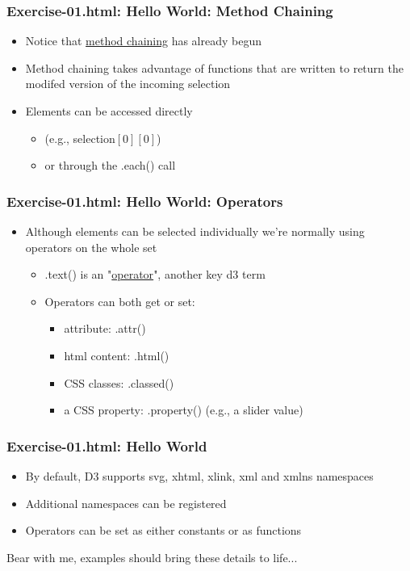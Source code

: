 \documentclass{beamer}
\begin{document}
\begin{frame}
    \frametitle{Exercise-01.html: Hello World: Method Chaining}
    \begin{itemize}
    \item Notice that \underline{method chaining} has already begun
    \item Method chaining takes advantage of functions that are written to return the modifed version of the incoming selection
    \item Elements can be accessed directly
        \begin{itemize}
        \item (e.g., selection$[0][0]$)
        \item or through the .each() call
        \end{itemize}
    \end{itemize}
\end{frame}



\begin{frame}
    \frametitle{Exercise-01.html: Hello World: Operators}
    \begin{itemize}
    \item Although elements can be selected individually we're normally using operators on the whole set
        \begin{itemize}
        \item .text() is an "\underline{operator}", another key d3 term
        \item Operators can both get or set:
            \begin{itemize}
            \item attribute: .attr()
            \item html content: .html()
            \item CSS classes: .classed() 
            \item a CSS property: .property() (e.g., a slider value)
            \end{itemize}
        \end{itemize}
    \end{itemize}
\end{frame}



\begin{frame}
    \frametitle{Exercise-01.html: Hello World}
    \begin{itemize}
    \item By default, D3 supports svg, xhtml, xlink, xml and xmlns namespaces
    \item Additional namespaces can be registered
    \item Operators can be set as either constants or as functions
    \end{itemize}
Bear with me, examples should bring these details to life... 
\end{frame}
\end{document}
